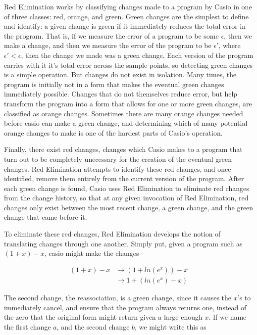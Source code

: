 \documentclass{article}
\newcommand{\lnexp}[1]{ln\left(e^{#1}\right)}
\begin{document}
Red Elimination works by classifying changes made to a program by Casio in one of three classes: 
red, orange, and green. 
Green changes are the simplest to define and identify: 
a given change is green if it immediately reduces the total error in the program. 
That is, if we measure the error of a program to be some $\epsilon$, 
then we make a change, 
and then we measure the error of the program to be $\epsilon'$, 
where $\epsilon' < \epsilon$, 
then the change we made was a green change. 
Each version of the program carries with it 
it's total error across the sample points, 
so detecting green changes is a simple operation. 
But changes do not exist in isolation. 
Many times, the program is initially not in a form 
that makes the eventual green changes immediately possible. 
Changes that do not themselves reduce error, 
but help transform the program into a form 
that allows for one or more green changes, 
are classified as orange changes. 
Sometimes there are many orange changes needed 
before casio can make a green change, 
and determining which of many potential orange changes 
to make is one of the hardest parts of Casio's operation.

Finally, there exist red changes, 
changes which Casio makes to a program 
that turn out to be completely unecessary 
for the creation of the eventual green changes. 
Red Elimination attempts to identify these red changes, 
and once identified, 
remove them entirely from the current version of the program. 
After each green change is found, 
Casio uses Red Elimination to eliminate red changes from the change history, 
so that at any given invocation of Red Elimination, 
red changes only exist between the most recent change, 
a green change,
and the green change that came before it.

To eliminate these red changes, 
Red Elimination develops the notion of translating changes through one another. 
Simply put, 
given a program such as $(1 + x) - x$, 
casio might make the changes

\begin{align*}
(1 + x) - x
&\to (1 + \lnexp{x}) - x\\
&\to 1 + (\lnexp{x} - x)
\end{align*}

The second change, 
the reassociation, is a green change, 
since it causes the $x$'s to immediately cancel, 
and ensure that the program always returns one, 
instead of the zero that the original form might return 
given a large enough $x$. 
If we name the first change $a$, 
and the second change $b$, 
we might write this as 
\end{document}
